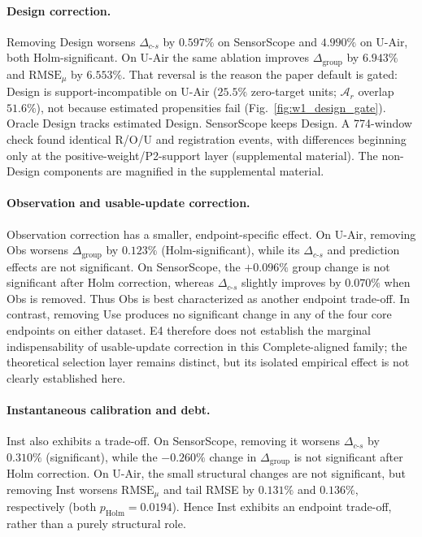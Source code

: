 \documentclass[letterpaper,journal]{IEEEtran}
\begin{document}
\paragraph{Design correction.}
Removing Design worsens $\Delta_{c\text{-}s}$ by $0.597\%$ on SensorScope and
$4.990\%$ on U-Air, both Holm-significant.  On U-Air the same ablation
improves $\Delta_{\mathrm{group}}$ by $6.943\%$ and
$\mathrm{RMSE}_{\mu}$ by $6.553\%$.  That reversal is the reason the
paper default is gated: Design is support-incompatible on U-Air
($25.5\%$ zero-target units; $\mathcal{A}_r$ overlap $51.6\%$), not
because estimated propensities fail
(Fig.~\ref{fig:w1_design_gate}).  Oracle Design tracks estimated
Design.  SensorScope keeps Design.  A 774-window check found identical
R/O/U and registration events, with differences beginning only at the
positive-weight/P2-support layer
(supplemental material).
The non-Design components are magnified in the supplemental material.

\paragraph{Observation and usable-update correction.}
Observation correction has a smaller, endpoint-specific effect.  On U-Air,
removing Obs worsens $\Delta_{\mathrm{group}}$ by $0.123\%$
(Holm-significant), while its $\Delta_{c\text{-}s}$ and prediction effects are
not significant.  On SensorScope, the $+0.096\%$ group change is not
significant after Holm correction, whereas
$\Delta_{c\text{-}s}$ slightly improves by $0.070\%$ when Obs is removed.
Thus Obs is best characterized as another endpoint trade-off.  In contrast,
removing Use produces no significant change in any of the four core endpoints
on either dataset.  E4 therefore does not establish the marginal
indispensability of usable-update correction in this Complete-aligned family;
the theoretical selection layer remains distinct, but its isolated empirical
effect is not clearly established here.

\paragraph{Instantaneous calibration and debt.}
Inst also exhibits a trade-off.  On SensorScope, removing it worsens
$\Delta_{c\text{-}s}$ by $0.310\%$ (significant), while the
$-0.260\%$ change in $\Delta_{\mathrm{group}}$ is not significant after Holm
correction.  On U-Air, the small structural
changes are not significant, but removing Inst worsens
$\mathrm{RMSE}_{\mu}$ and tail RMSE by $0.131\%$ and $0.136\%$,
respectively (both $p_{\mathrm{Holm}}=0.0194$).  Hence Inst exhibits an
endpoint trade-off, rather than a purely structural role.
\end{document}
